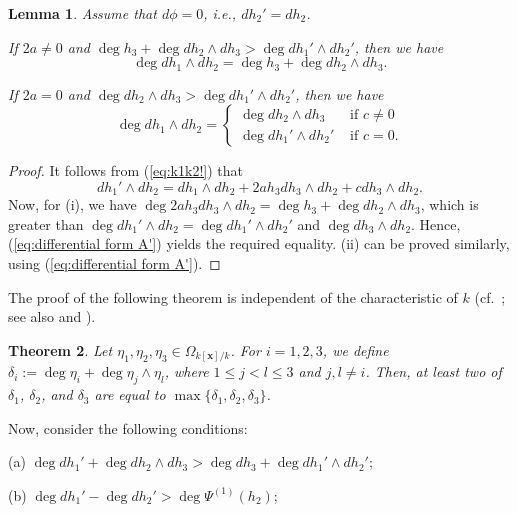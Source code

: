 \documentclass{amsart}
\theoremstyle{plain}
\newtheorem{thm}{Theorem}[section]
\newtheorem{lem}[thm]{Lemma}
\theoremstyle{definition}
\newcommand{\nd}{\noindent}
\newcommand{\x}{{\boldsymbol x}}
\newcommand{\kx}{k[\x]}
\begin{document}
\begin{lem}\label{note:cofactor}
Assume that $d\phi =0$, i.e., $dh_2'=dh_2$. 


\nd {\rm (i)} 
If $2a\neq 0$ and 
$\deg h_3+\deg dh_2\wedge dh_3>\deg dh_1'\wedge dh_2'$, 
then we have 
$$
\deg dh_1\wedge dh_2=\deg h_3+\deg dh_2\wedge dh_3. 
$$


\nd {\rm (ii)} 
If $2a=0$ and $\deg dh_2\wedge dh_3>\deg dh_1'\wedge dh_2'$, 
then we have 
$$
\deg dh_1\wedge dh_2=\left\{
\begin{array}{ll}
\deg dh_2\wedge dh_3 & \text{ if }
c\ne 0 \\
\deg dh_1'\wedge dh_2' & \text{ if }c=0 .
\end{array}
\right. 
$$
\end{lem}
\begin{proof}
It follows from (\ref{eq:k1k2!}) that 
\begin{equation}\label{eq:differential form A'}
dh_1'\wedge dh_2
=dh_1\wedge dh_2+2ah_3dh_3\wedge dh_2+cdh_3\wedge dh_2. 
\end{equation}
Now, for (i), 
we have $\deg 2ah_3dh_3\wedge dh_2=\deg h_3+\deg dh_2\wedge dh_3$, 
which is greater than 
$\deg dh_1'\wedge dh_2=\deg dh_1'\wedge dh_2'$ 
and $\deg dh_3\wedge dh_2$. 
Hence, 
(\ref{eq:differential form A'}) 
yields the required equality. 
(ii) can be proved similarly, 
using (\ref{eq:differential form A'}). 
\end{proof}




The proof of the following theorem 
is independent of the characteristic of $k$ 
(cf.\ \cite[Theorem 5.2]{SUineq}; see also 
\cite[Theorem 1.3.9]{JC} and \cite[Lemma 5]{SU}). 


\begin{thm}
\label{thm:another}
Let $\eta _1,\eta _2,\eta _3\in \Omega _{\kx /k}$. 
For $i=1,2,3$, 
we define 
$\delta _i:=\deg \eta _i+\deg \eta _j\wedge \eta _l$, 
where $1\le j<l\le 3$ and $j,l\ne i$. 
Then, at least two of $\delta _1$, $\delta _2$, and $\delta _3$ 
are equal to $\max \{ \delta _1,\delta _2,\delta _3\} $. 
\end{thm}



Now, 
consider the following conditions: 


\smallskip 

(a) 
$\deg dh_1'+\deg dh_2\wedge dh_3
>\deg dh_3+\deg dh_1'\wedge dh_2'$; 

\smallskip 


(b) 
$\deg dh_1'-\deg dh_2'>\deg \Psi ^{(1)}(h_2)$; 
\end{document}
